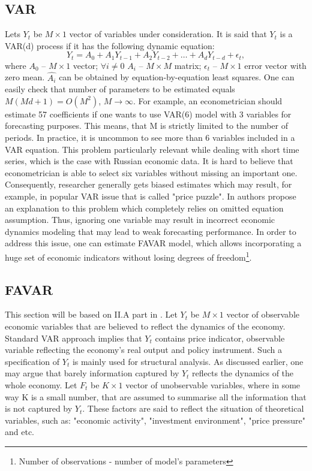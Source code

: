 \documentclass[a4paper, 14pt]{article}
\begin{document}
\subsection{VAR}
Lets $Y_t$ be $M\times 1$ vector of variables under consideration. It is said that $Y_t$ is a VAR(d) process if it has the following dynamic equation:
\begin{equation}
Y_t = A_0 + A_1 Y_{t-1} + A_2 Y_{t-2} + \dotso + A_d Y_{t-d} + \epsilon_t,
\end{equation}
where $A_0$ -- $M\times1$ vector; $\forall i\neq0$ $A_i$  -- $M\times M$ matrix; $\epsilon_t$ -- $M\times 1$ error vector with zero mean. $\hat{A_i}$ can be obtained by equation-by-equation least squares. One can easily check that number of parameters to be estimated equals $M(M d + 1) = O(M^2)$, $M \rightarrow \infty$. For example, an econometrician should estimate 57 coefficients if one wants to use VAR(6) model with 3 variables for forecasting purposes. This means, that M is strictly limited to the number of periods. In practice, it is uncommon to see more than 6 variables included in a VAR equation. This problem particularly relevant while dealing with short time series, which is the case with Russian economic data. It is hard to believe that econometrician is able to select six variables without missing an important one. Consequently, researcher generally gets biased estimates which may result, for example, in popular VAR issue that is called "price puzzle". In \cite{bernanke2005measuring} authors propose an explanation to this problem which completely relies on omitted equation assumption. Thus, ignoring one variable may result in incorrect economic dynamics modeling that may lead to weak forecasting performance. In order to address this issue, one can estimate FAVAR model, which allows incorporating a huge set of economic indicators without losing degrees of freedom\footnote{Number of observations - number of model's parameters}.

\subsection{FAVAR}
This section will be based on II.A part in \cite{bernanke2005measuring}. Let $Y_t$ be $M \times 1$ vector of observable economic variables that are believed to reflect the dynamics of the economy. Standard VAR approach implies that $Y_t$ contains price indicator, observable variable reflecting the economy's real output and policy instrument. Such a specification of $Y_t$ is mainly used for structural analysis. As discussed earlier, one may argue that barely information captured by $Y_t$ reflects the dynamics of the whole economy. Let $F_t$ be $K \times 1$ vector of unobservable variables, where in some way K is a small number, that are assumed to summarise all the information that is not captured by $Y_t$. These factors are said to reflect the situation of theoretical variables, such as: "economic activity", "investment environment", "price pressure" and etc. 
\end{document}
